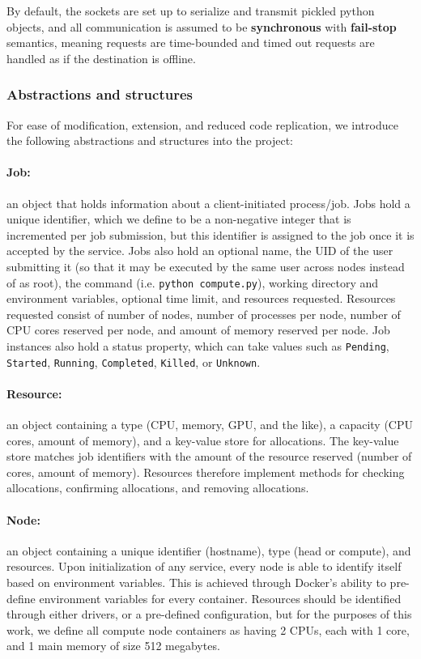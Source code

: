 \documentclass[sigconf]{acmart}
\begin{document}
By default, the sockets are set up to serialize and transmit pickled python objects, and all communication is assumed to be
\textbf{synchronous} with \textbf{fail-stop} semantics, meaning requests are time-bounded and timed out requests are handled as
if the destination is offline.

\subsubsection{Abstractions and structures}
For ease of modification, extension, and reduced code replication, we introduce the following abstractions and structures into
the project:

\paragraph{Job:} an object that holds information about a client-initiated process/job.
Jobs hold a unique identifier, which we define to be a non-negative integer that is incremented per job submission,
but this identifier is assigned to the job once it is accepted by the service.
Jobs also hold an optional name, the UID of the user submitting it (so that it may be executed by the same user across nodes
instead of as root), the command (i.e. \verb|python compute.py|), working directory and environment variables, optional time
limit, and resources requested.
Resources requested consist of number of nodes, number of processes per node, number of CPU cores reserved per node, and amount
of memory reserved per node.
Job instances also hold a status property, which can take values such as \verb|Pending|, \verb|Started|, \verb|Running|,
\verb|Completed|, \verb|Killed|, or \verb|Unknown|.

\paragraph{Resource:} an object containing a type (CPU, memory, GPU, and the like), a capacity (CPU cores, amount of memory),
and a key-value store for allocations.
The key-value store matches job identifiers with the amount of the resource reserved (number of cores, amount of memory).
Resources therefore implement methods for checking allocations, confirming allocations, and removing allocations.

\paragraph{Node:} an object containing a unique identifier (hostname), type (head or compute), and resources.
Upon initialization of any service, every node is able to identify itself based on environment variables.
This is achieved through Docker's ability to pre-define environment variables for every container.
Resources should be identified through either drivers, or a pre-defined configuration, but for the purposes of this work, we
define all compute node containers as having 2 CPUs, each with 1 core, and 1 main memory of size 512 megabytes.
\end{document}
